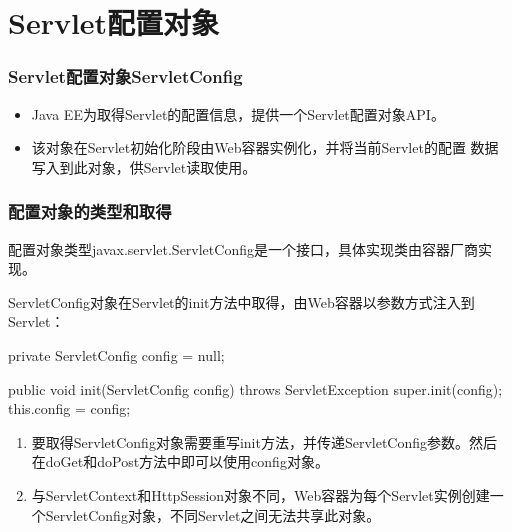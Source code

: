 \section{Servlet配置对象}

\begin{frame}[fragile] %
  \frametitle{Servlet配置对象ServletConfig}

  \begin{itemize}
  \item Java EE为取得Servlet的配置信息，提供一个Servlet配置对象API。
  \item 该对象在Servlet初始化阶段由Web容器实例化，并将当前Servlet的配置
    数据写入到此对象，供Servlet读取使用。
\end{itemize}
\end{frame}

\begin{frame}[fragile] %
  \frametitle{配置对象的类型和取得} 

  配置对象类型javax.servlet.ServletConfig是一个接口，具体实现类由容器厂商实现。

  ServletConfig对象在Servlet的init方法中取得，由Web容器以参数方式注入到Servlet：

  \begin{javaCode}
    private ServletConfig config = null;

    public void init(ServletConfig config) throws ServletException {
      super.init(config);
      this.config = config;
    }
  \end{javaCode}

  \begin{enumerate}\kai
  \item 要取得ServletConfig对象需要重写init方法，并传递ServletConfig参数。然后
    在doGet和doPost方法中即可以使用config对象。
  \item 与ServletContext和HttpSession对象不同，Web容器为每个Servlet实例创建一
    个ServletConfig对象，不同Servlet之间无法共享此对象。
  \end{enumerate}
\end{frame}

